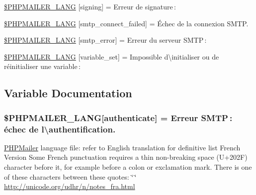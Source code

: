 \begin{DoxyCompactItemize}
\item 
\hyperlink{phpmailer_8lang-fr_8php_a68e437bdb9b968a5a67320f03d231565}{\$\+P\+H\+P\+M\+A\+I\+L\+E\+R\+\_\+\+L\+A\+NG} \mbox{[}\textquotesingle{}signing\textquotesingle{}\mbox{]} = \textquotesingle{}Erreur de signature \+: \textquotesingle{}
\item 
\hyperlink{phpmailer_8lang-fr_8php_a7b321d4ca1e9df702403ed4c61aa0980}{\$\+P\+H\+P\+M\+A\+I\+L\+E\+R\+\_\+\+L\+A\+NG} \mbox{[}\textquotesingle{}smtp\+\_\+connect\+\_\+failed\textquotesingle{}\mbox{]} = \textquotesingle{}Échec de la connexion S\+M\+T\+P.\textquotesingle{}
\item 
\hyperlink{phpmailer_8lang-fr_8php_a7d9cffba1e669c845f8a4c891ee50064}{\$\+P\+H\+P\+M\+A\+I\+L\+E\+R\+\_\+\+L\+A\+NG} \mbox{[}\textquotesingle{}smtp\+\_\+error\textquotesingle{}\mbox{]} = \textquotesingle{}Erreur du serveur S\+M\+T\+P \+: \textquotesingle{}
\item 
\hyperlink{phpmailer_8lang-fr_8php_af795debc7a739d038742691c358d9032}{\$\+P\+H\+P\+M\+A\+I\+L\+E\+R\+\_\+\+L\+A\+NG} \mbox{[}\textquotesingle{}variable\+\_\+set\textquotesingle{}\mbox{]} = \textquotesingle{}Impossible d\textbackslash{}\textquotesingle{}initialiser ou de réinitialiser une variable \+: \textquotesingle{}
\end{DoxyCompactItemize}


\subsection{Variable Documentation}
\subsubsection[{\texorpdfstring{\$\+P\+H\+P\+M\+A\+I\+L\+E\+R\+\_\+\+L\+A\+NG}{$PHPMAILER_LANG}}]{\setlength{\rightskip}{0pt plus 5cm}\$P\+H\+P\+M\+A\+I\+L\+E\+R\+\_\+\+L\+A\+NG\mbox{[}\textquotesingle{}authenticate\textquotesingle{}\mbox{]} = \textquotesingle{}Erreur S\+M\+T\+P \+: échec de l\textbackslash{}\textquotesingle{}authentification.\textquotesingle{}}\hypertarget{phpmailer_8lang-fr_8php_a2cb33073c989b85580748e331ed8b4aa}{}\label{phpmailer_8lang-fr_8php_a2cb33073c989b85580748e331ed8b4aa}
\hyperlink{class_p_h_p_mailer}{P\+H\+P\+Mailer} language file\+: refer to English translation for definitive list French Version Some French punctuation requires a thin non-\/breaking space (U+202F) character before it, for example before a colon or exclamation mark. There is one of these characters between these quotes\+: \char`\"{} \char`\"{} \hyperlink{}{http\+://unicode.\+org/udhr/n/notes\+\_\+fra.\+html}

